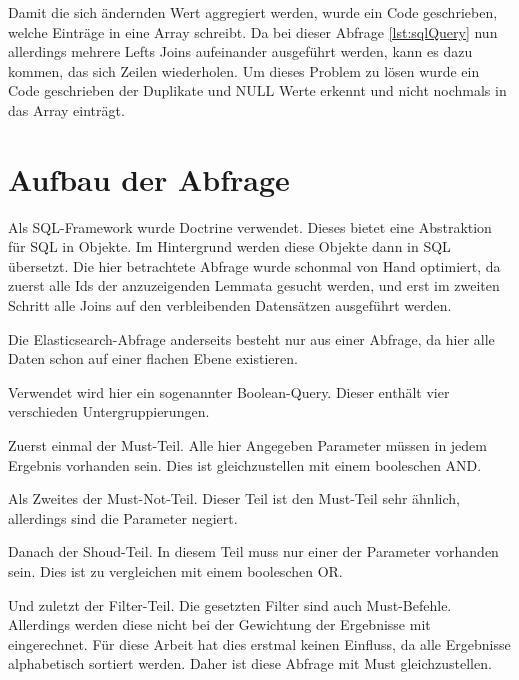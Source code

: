 Damit die sich ändernden Wert aggregiert werden, wurde ein Code geschrieben, welche Einträge in eine Array schreibt. Da bei dieser Abfrage \ref{lst:sqlQuery} nun allerdings mehrere Lefts Joins aufeinander ausgeführt werden, kann es dazu kommen, das sich Zeilen wiederholen. Um dieses Problem zu lösen wurde ein Code geschrieben der Duplikate und NULL Werte erkennt und nicht nochmals in das Array einträgt.

\section{Aufbau der Abfrage}

Als SQL-Framework wurde Doctrine verwendet. Dieses bietet eine Abstraktion für SQL in Objekte. Im Hintergrund werden diese Objekte dann in SQL übersetzt. Die hier betrachtete Abfrage wurde schonmal von Hand optimiert, da zuerst alle Ids der anzuzeigenden Lemmata gesucht werden, und erst im zweiten Schritt alle Joins auf den verbleibenden Datensätzen ausgeführt werden.

Die Elasticsearch-Abfrage anderseits besteht nur aus einer Abfrage, da hier alle Daten schon auf einer flachen Ebene existieren.

Verwendet wird hier ein sogenannter Boolean-Query. Dieser enthält vier verschieden Untergruppierungen.

Zuerst einmal der Must-Teil. Alle hier Angegeben Parameter müssen in jedem Ergebnis vorhanden sein. Dies ist gleichzustellen mit einem booleschen AND. 

Als Zweites der Must-Not-Teil. Dieser Teil ist den Must-Teil sehr ähnlich, allerdings sind die Parameter negiert.

Danach der Shoud-Teil. In diesem Teil muss nur einer der Parameter vorhanden sein. Dies ist zu vergleichen mit einem booleschen OR. 

Und zuletzt der Filter-Teil. Die gesetzten Filter sind auch Must-Befehle. Allerdings werden diese nicht bei der Gewichtung der Ergebnisse mit eingerechnet. Für diese Arbeit hat dies erstmal keinen Einfluss, da alle Ergebnisse alphabetisch sortiert werden. Daher ist diese Abfrage mit Must gleichzustellen. \cite{ElasticsearchB.V..17.12.2019}


